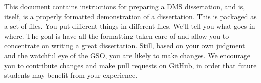 \noindent


\noindent

This document contains instructions for preparing a DMS dissertation, and is, itself, is a properly formatted demonstration of a dissertation. This is packaged as a set of files. You put different things in different files. We'll tell you what goes in where. The goal is have all the formatting taken care of and allow you to concentrate on writing a great dissertation. Still, based on your own judgment and the watchful eye of the GSO, you are likely to make changes. We encourage you to contribute changes and make pull requests on GitHub, in order that future students may benefit from your experience.
